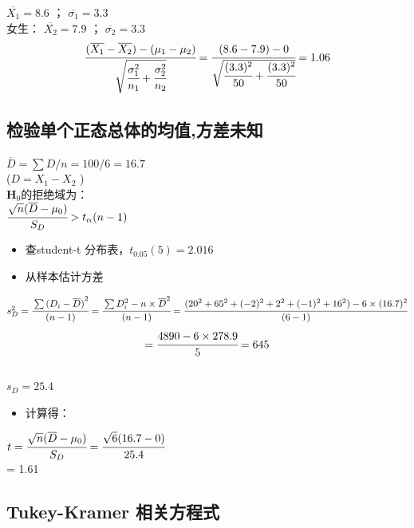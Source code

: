 \(\overline{X_1} = 8.6\) ； \(\overline{\sigma_1} = 3.3\)\\
女生： \(\overline{X_2} = 7.9\) ； \(\overline{\sigma_2} = 3.3\)\\

\[\cfrac{ (\overline{X_1} - \overline{X_2}) - ({\mu}_1  - {\mu}_2)}{\sqrt{\cfrac{\sigma_1^2}{n_1} + \cfrac{\sigma_2^2}{n_2}}} = \cfrac{ (8.6 - 7.9) - 0 }{\sqrt{\cfrac{(3.3)^2}{50} + \cfrac{(3.3)^2}{50}}} = 1.06\]

\hypertarget{ux68c0ux9a8cux5355ux4e2aux6b63ux6001ux603bux4f53ux7684ux5747ux503cux65b9ux5deeux672aux77e5-1}{%
\subsection{检验单个正态总体的均值,方差未知}\label{ux68c0ux9a8cux5355ux4e2aux6b63ux6001ux603bux4f53ux7684ux5747ux503cux65b9ux5deeux672aux77e5-1}}

\(\overline{D} = \sum D / n = 100/6 = 16.7\)\\
(\(D = X_1 - X_2\) )\\
\(\mathbf{H}_0\)的拒绝域为：\\
\(\cfrac{ \sqrt{n}(\overline{D} - \mu _0) }{S_D}  > t_\alpha(n-1)\)\\

\begin{itemize}
\tightlist
\item
  查student-t 分布表，\(t_{0.05} (5) = 2.016\)
\item
  从样本估计方差\\
\end{itemize}

\(s_D^2 = \cfrac{\sum {(D_i - \overline{D})}^2  }{(n - 1)}= \cfrac{\sum D_i^2 - n \times \overline{D}^2  }{(n - 1)} = \cfrac{(20^2 + 65^2 + (-2)^2 + 2^2 + (-1)^2 + 16^2) - 6 \times (16.7)^2  }{(6 - 1)}\)\\
\[= \cfrac{4890 - 6 \times 278.9  }{5} = 645\]\\
\(s_D = 25.4\)\\

\begin{itemize}
\tightlist
\item
  计算得：
\end{itemize}

\(t = \cfrac{ \sqrt{n}(\overline{D} - \mu _0) }{S_D} = \cfrac{ \sqrt{6}(16.7 - 0) }{25.4}\)\\
 = 1.61\\

\hypertarget{tukey-kramer-ux76f8ux5173ux65b9ux7a0bux5f0f}{%
\subsection{Tukey-Kramer
相关方程式}\label{tukey-kramer-ux76f8ux5173ux65b9ux7a0bux5f0f}}

